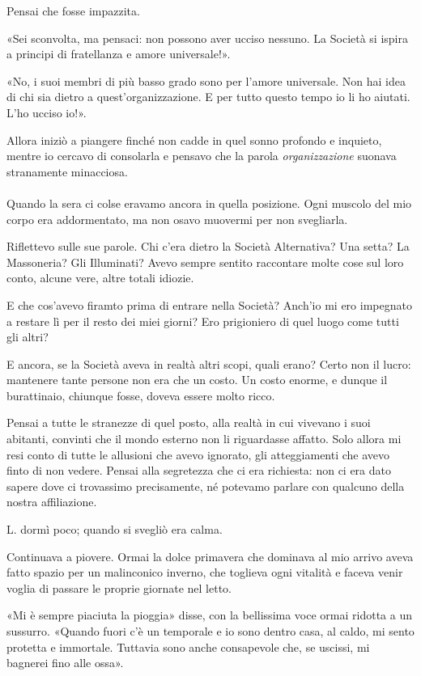 \documentclass[a4paper,12pt]{book}
\begin{document}
Pensai che fosse impazzita.

«Sei sconvolta, ma pensaci: non possono aver ucciso nessuno. La Società si
ispira a principi di fratellanza e amore universale!».

«No, i suoi membri di più basso grado sono per l'amore universale. Non hai idea
di chi sia dietro a quest'organizzazione. E per tutto questo tempo io li ho
aiutati. L'ho ucciso io!».

Allora iniziò a piangere finché non cadde in quel sonno profondo e inquieto,
mentre io cercavo di consolarla e pensavo che la parola \emph{organizzazione}
suonava stranamente minacciosa.

\paragraph{}
Quando la sera ci colse eravamo ancora in quella posizione. Ogni muscolo del
mio corpo era addormentato, ma non osavo muovermi per non svegliarla.

Riflettevo sulle sue parole. Chi c'era dietro la Società Alternativa? Una setta?
La Massoneria? Gli Illuminati? Avevo sempre sentito raccontare molte cose sul
loro conto, alcune vere, altre totali idiozie.

E che cos'avevo firamto prima di entrare nella Società? Anch'io mi ero impegnato
a restare lì per il resto dei miei giorni? Ero prigioniero di quel luogo come
tutti gli altri?

E ancora, se la Società aveva in realtà altri scopi, quali erano? Certo non il
lucro: mantenere tante persone non era che un costo. Un costo enorme, e dunque
il burattinaio, chiunque fosse, doveva essere molto ricco.

Pensai a tutte le stranezze di quel posto, alla realtà in cui vivevano i suoi
abitanti, convinti che il mondo esterno non li riguardasse affatto. Solo allora
mi resi conto di tutte le allusioni che avevo ignorato, gli atteggiamenti che
avevo finto di non vedere. Pensai alla segretezza che ci era richiesta: non ci
era dato sapere dove ci trovassimo precisamente, né potevamo parlare con
qualcuno della nostra affiliazione.

L. dormì poco; quando si svegliò era calma.

Continuava a piovere. Ormai la dolce primavera che dominava al mio arrivo aveva
fatto spazio per un malinconico inverno, che toglieva ogni vitalità e faceva
venir voglia di passare le proprie giornate nel letto.

«Mi è sempre piaciuta la pioggia» disse, con la bellissima voce ormai ridotta
a un sussurro. «Quando fuori c'è un temporale e io sono dentro casa, al caldo,
mi sento protetta e immortale. Tuttavia sono anche consapevole che, se uscissi,
mi bagnerei fino alle ossa».
\end{document}
